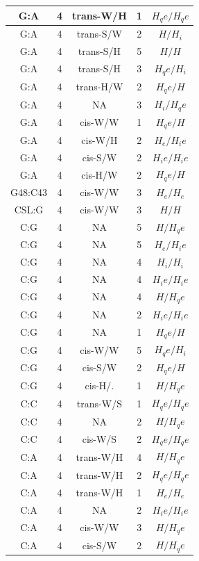 \begin{center}
\begin{longtable}{c|c|c|c|c}
G:A & 4 & trans-W/H & 1 & $H_qe/H_qe$ \\  \hline
G:A & 4 & trans-S/W & 2 & $H/H_i$ \\  \hline
G:A & 4 & trans-S/H & 5 & $H/H$ \\  \hline
G:A & 4 & trans-S/H & 3 & $H_qe/H_i$ \\  \hline
G:A & 4 & trans-H/W & 2 & $H_qe/H$ \\  \hline
G:A & 4 & NA & 3 & $H_i/H_qe$ \\  \hline
G:A & 4 & cis-W/W & 1 & $H_qe/H$ \\  \hline
G:A & 4 & cis-W/H & 2 & $H_e/H_ie$ \\  \hline
G:A & 4 & cis-S/W & 2 & $H_ie/H_ie$ \\  \hline
G:A & 4 & cis-H/W & 2 & $H_qe/H$ \\  \hline
G48:C43 & 4 & cis-W/W & 3 & $H_e/H_e$ \\  \hline
CSL:G & 4 & cis-W/W & 3 & $H/H$ \\  \hline
C:G & 4 & NA & 5 & $H/H_qe$ \\  \hline
C:G & 4 & NA & 5 & $H_e/H_ie$ \\  \hline
C:G & 4 & NA & 4 & $H_i/H_i$ \\  \hline
C:G & 4 & NA & 4 & $H_ie/H_ie$ \\  \hline
C:G & 4 & NA & 4 & $H/H_qe$ \\  \hline
C:G & 4 & NA & 2 & $H_ie/H_ie$ \\  \hline
C:G & 4 & NA & 1 & $H_qe/H$ \\  \hline
C:G & 4 & cis-W/W & 5 & $H_qe/H_i$ \\  \hline
C:G & 4 & cis-S/W & 2 & $H_qe/H$ \\  \hline
C:G & 4 & cis-H/. & 1 & $H/H_qe$ \\  \hline
C:C & 4 & trans-W/S & 1 & $H_qe/H_qe$ \\  \hline
C:C & 4 & NA & 2 & $H/H_qe$ \\  \hline
C:C & 4 & cis-W/S & 2 & $H_qe/H_qe$ \\  \hline
C:A & 4 & trans-W/H & 4 & $H/H_qe$ \\  \hline
C:A & 4 & trans-W/H & 2 & $H_qe/H_qe$ \\  \hline
C:A & 4 & trans-W/H & 1 & $H_e/H_e$ \\  \hline
C:A & 4 & NA & 2 & $H_ie/H_ie$ \\  \hline
C:A & 4 & cis-W/W & 3 & $H/H_qe$ \\  \hline
C:A & 4 & cis-S/W & 2 & $H/H_qe$ \\  \hline

\end{longtable}
\end{center}
